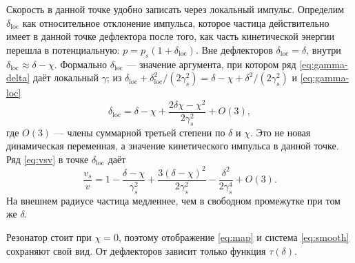 Скорость в данной точке удобно записать через локальный импульс. Определим $\delta_{\mathrm{loc}}$ как относительное отклонение импульса, которое частица действительно имеет в данной точке дефлектора после того, как часть кинетической энергии перешла в потенциальную: $p=p_s(1+\delta_{\mathrm{loc}})$. Вне дефлекторов $\delta_{\mathrm{loc}}=\delta$, внутри $\delta_{\mathrm{loc}}\approx\delta-\chi$. Формально $\delta_{\mathrm{loc}}$ --- значение аргумента, при котором ряд \eqref{eq:gamma-delta} даёт локальный $\gamma$; из $\delta_{\mathrm{loc}}+\delta_{\mathrm{loc}}^2/(2\gamma_s^2)=\delta-\chi+\delta^2/(2\gamma_s^2)$ и \eqref{eq:gamma-loc}
\begin{equation}
\label{eq:delta-loc}
\delta_{\mathrm{loc}}
=\delta-\chi+\frac{2\delta\chi-\chi^2}{2\gamma_s^2}+O(3),
\end{equation}
где $O(3)$ --- члены суммарной третьей степени по $\delta$ и $\chi$. Это не новая динамическая переменная, а значение кинетического импульса в данной точке. Ряд \eqref{eq:vsv} в точке $\delta_{\mathrm{loc}}$ даёт
\begin{equation}
\label{eq:vsv-es}
\frac{v_s}{v}
=1-\frac{\delta-\chi}{\gamma_s^2}
+\frac{3(\delta-\chi)^2}{2\gamma_s^2}
-\frac{\delta^2}{2\gamma_s^4}
+O(3).
\end{equation}
На внешнем радиусе частица медленнее, чем в свободном промежутке при том же $\delta$.

Резонатор стоит при $\chi=0$, поэтому отображение \eqref{eq:map} и система \eqref{eq:smooth} сохраняют свой вид. От дефлекторов зависит только функция $\tau(\delta)$.

